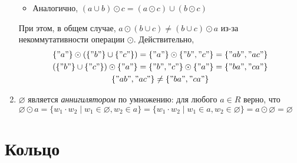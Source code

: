 \begin{example}
\begin{enumerate}
\begin{itemize}
                  \item Аналогично, $(a \cup b) \odot c = (a \odot c) \cup (b \odot c)$
              \end{itemize}
              При этом, в общем случае, $a \odot (b \cup c) \neq (b \cup c) \odot a$ из-за некоммутативности операции $\odot$.
              Действительно,
              \begin{gather*}
                  \{"a"\} \odot (\{"b"\} \cup \{"c"\}) = \{"a"\} \odot \{"b","c" \} = \{"ab","ac" \} \\
                  (\{"b"\} \cup \{"c"\}) \odot \{"a"\} =  \{"b", "c"\} \odot \{"a"\} = \{"ba","ca"\} \\
                  \{"ab","ac"\} \neq \{"ba","ca"\}
              \end{gather*}
        \item $\varnothing$ является \emph{аннигилятором} по умножению: для любого $a \in R$ верно, что
              $\varnothing \odot a =  \{ w_1 \cdot w_2 \mid w_1 \in \varnothing, w_2 \in a \} =  \{ w_1 \cdot w_2 \mid w_1 \in a, w_2 \in \varnothing \} = a \odot \varnothing = \varnothing$
    \end{enumerate}
\end{example}

\section{Кольцо}


